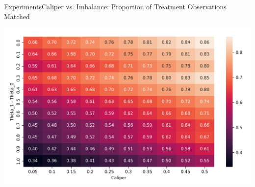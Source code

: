 \documentclass[11pt, compress]{beamer}
\begin{document}
\begin{frame}{Experiments}{Caliper vs. Imbalance: Proportion of Treatment Observations Matched}
	\begin{center}
		\includegraphics[width=\textwidth]{../paper/img/output30/caliper_vs_imbalance_big/plots/theta1_caliper_prop1_match.png}
	\end{center}
\end{frame}
\end{document}
